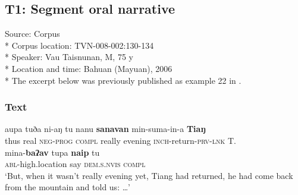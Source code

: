 \documentclass[output=paper
,modfonts
,nonflat]{langsci/langscibook}
\begin{document}
\subsection*{T1: Segment oral narrative}

Source:   Corpus\\*
Corpus location: TVN-008-002:130-134\\*
Speaker: Vau Taisnunan, M, 75 y\\*
Location and time: Bahuan (Mayuan), 2006\\*
The excerpt below was previously published as example 22 in \citet{DeBusser2017}.

\subsubsection*{Text}

\begin{exe}
	\label{tx1-1}
	\begin{xlist}
		\ex\label{tx1-1a}
		\gll aupa  tuða  ni-aŋ  tu  nanu  \textbf{sanavan}  min-suma-in-a  \textbf{Tiaŋ}\\
		thus  real  \textsc{neg}-\textsc{prog}  \textsc{compl}  really  evening  \textsc{inch}-return-\textsc{prv}-\textsc{lnk}  \textsc{T.}\\
		\ex\label{tx1-1b}
		\gll mina-\textbf{baʔav}  tupa  \textbf{naip}  tu\\
		\textsc{abl}-high.location  say  \textsc{dem}.\textsc{s}.\textsc{nvis}  \textsc{compl}\\
		\glt `But, when it wasn’t really evening yet, Tiang had returned, he had come back from the mountain and told us: …’
	\end{xlist}
\end{exe}
\end{document}
